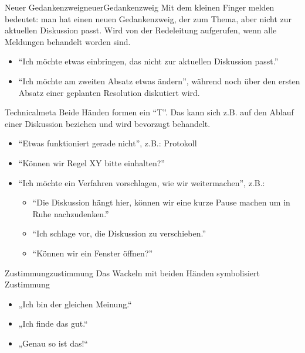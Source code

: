 \begin{handzeichen}[.2\linewidth]{Neuer Gedankenzweig}{neuerGedankenzweig}
	Mit dem kleinen Finger melden bedeutet: man hat einen neuen Gedankenzweig, der zum Thema, aber nicht zur aktuellen Diskussion passt. Wird von der Redeleitung aufgerufen, wenn alle Meldungen behandelt worden sind.
	
	\begin{itemize}
		\item \enquote{Ich möchte etwas einbringen, das nicht zur aktuellen Diskussion passt.}
		\item  \enquote{Ich möchte am zweiten Absatz etwas ändern}, während noch über den ersten Absatz einer geplanten Resolution diskutiert wird.
	\end{itemize}
\end{handzeichen}


\begin{handzeichen}{Technical}{meta}
Beide Händen formen ein \enquote{T}.
Das kann sich z.B. auf den Ablauf einer Diskussion beziehen und wird bevorzugt behandelt.
\begin{itemize}
	\item \enquote{Etwas funktioniert gerade nicht}, z.B.: Protokoll
	\item \enquote{Können wir Regel XY bitte einhalten?}
	\item \enquote{Ich möchte ein Verfahren vorschlagen, wie wir weitermachen}, z.B.:
	\begin{itemize}
	    \item \enquote{Die Diskussion hängt hier, können wir eine kurze Pause machen um in Ruhe nachzudenken.}
    	\item \enquote{Ich schlage vor, die Diskussion zu verschieben.}
	    \item \enquote{Können wir ein Fenster öffnen?}
	\end{itemize}
\end{itemize}
\end{handzeichen}

\begin{handzeichen}{Zustimmung}{zustimmung}
Das Wackeln mit beiden Händen symbolisiert Zustimmung 
\begin{itemize}
	\item „Ich bin der gleichen Meinung.“
	\item „Ich finde das gut.“
	\item „Genau so ist das!“
\end{itemize}
\end{handzeichen}

